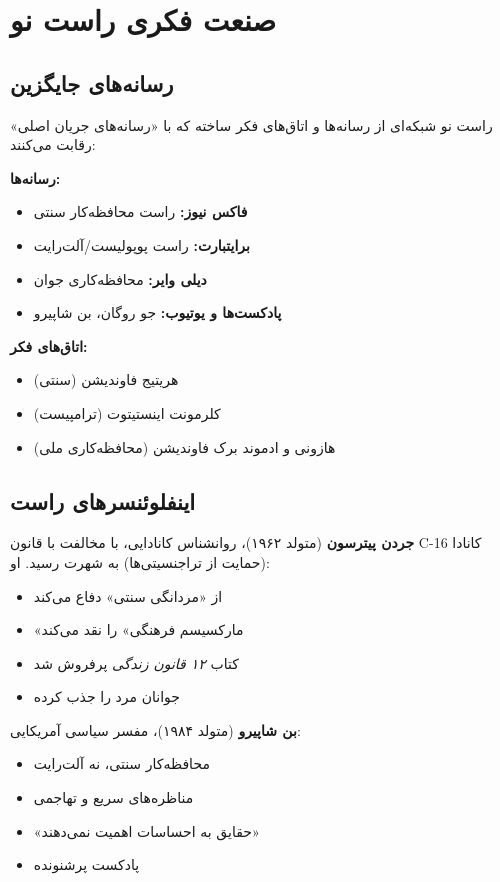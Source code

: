 \section{صنعت فکری راست نو}

\subsection{رسانه‌های جایگزین}


راست نو شبکه‌ای از رسانه‌ها و اتاق‌های فکر ساخته که با «رسانه‌های جریان اصلی» رقابت می‌کنند:

\textbf{رسانه‌ها:}
\begin{itemize}
    \item \textbf{فاکس نیوز:} راست محافظه‌کار سنتی
    \item \textbf{برایتبارت:} راست پوپولیست/آلت‌رایت
    \item \textbf{دیلی وایر:} محافظه‌کاری جوان
    \item \textbf{پادکست‌ها و یوتیوب:} جو روگان، بن شاپیرو
\end{itemize}

\textbf{اتاق‌های فکر:}
\begin{itemize}
    \item هریتیج فاوندیشن (سنتی)
    \item کلرمونت اینستیتوت (ترامپیست)
    \item هازونی و ادموند برک فاوندیشن (محافظه‌کاری ملی)
\end{itemize}


\subsection{اینفلوئنسرهای راست}


\textbf{جردن پیترسون} (متولد ۱۹۶۲)، روانشناس کانادایی، با مخالفت با قانون C-16 کانادا (حمایت از تراجنسیتی‌ها) به شهرت رسید. او:
\begin{itemize}
    \item از «مردانگی سنتی» دفاع می‌کند
    \item «مارکسیسم فرهنگی» را نقد می‌کند
    \item کتاب \textit{۱۲ قانون زندگی} پرفروش شد
    \item جوانان مرد را جذب کرده
\end{itemize}

\textbf{بن شاپیرو} (متولد ۱۹۸۴)، مفسر سیاسی آمریکایی:
\begin{itemize}
    \item محافظه‌کار سنتی، نه آلت‌رایت
    \item مناظره‌های سریع و تهاجمی
    \item «حقایق به احساسات اهمیت نمی‌دهند»
    \item پادکست پرشنونده
\end{itemize}

